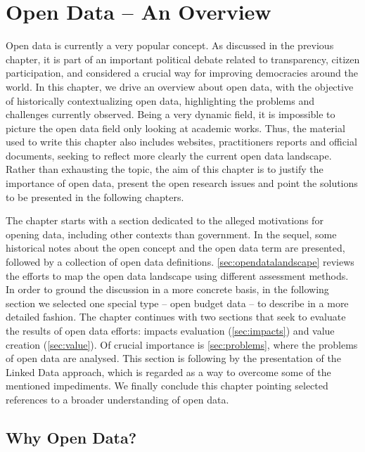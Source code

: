 \chapter{Open Data -- An Overview}
\label{chap:opendata}

Open data is currently a very popular concept.
As discussed in the previous chapter, it is part of an important political debate related to transparency, citizen participation, and considered a crucial way for improving democracies around the world.
In this chapter, we drive an overview about open data, with the objective of historically contextualizing open data, highlighting the problems and challenges currently observed.
Being a very dynamic field, it is impossible to picture the open data field only looking at academic works.
Thus, the material used to write this chapter also includes websites, practitioners reports and official documents, seeking to reflect more clearly the current open data landscape.
Rather than exhausting the topic, the aim of this chapter is to justify the importance of open data, present the open research issues and point the solutions to be presented in the following chapters.

The chapter starts with a section dedicated to the alleged motivations for opening data, including other contexts than government.
In the sequel, some historical notes about the open concept and the open data term are presented, followed by a collection of open data definitions.
\autoref{sec:opendatalandscape} reviews the efforts to map the open data landscape using different assessment methods.
In order to ground the discussion in a more concrete basis, in the following section we selected one special type -- open budget data -- to describe in a more detailed fashion.
The chapter continues with two sections that seek to evaluate the results of open data efforts: impacts evaluation (\autoref{sec:impacts}) and value creation (\autoref{sec:value}).
Of crucial importance is \autoref{sec:problems}, where the problems of open data are analysed.
This section is following by the presentation of the Linked Data approach, which is regarded as a way to overcome some of the mentioned impediments.
We finally conclude this chapter pointing selected references to a broader understanding of open data. 

\section{Why Open Data?}
\label{sec:why}

